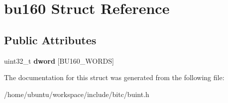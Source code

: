 \hypertarget{structbu160}{\section{bu160 Struct Reference}
\label{structbu160}
}
\subsection*{Public Attributes}
\begin{DoxyCompactItemize}
\item 
\hypertarget{structbu160_a77c251b87980b1a0a259b009e605f519}{uint32\-\_\-t {\bfseries dword} \mbox{[}B\-U160\-\_\-\-W\-O\-R\-D\-S\mbox{]}}\label{structbu160_a77c251b87980b1a0a259b009e605f519}

\end{DoxyCompactItemize}


The documentation for this struct was generated from the following file\-:\begin{DoxyCompactItemize}
\item 
/home/ubuntu/workspace/include/bitc/buint.\-h\end{DoxyCompactItemize}
